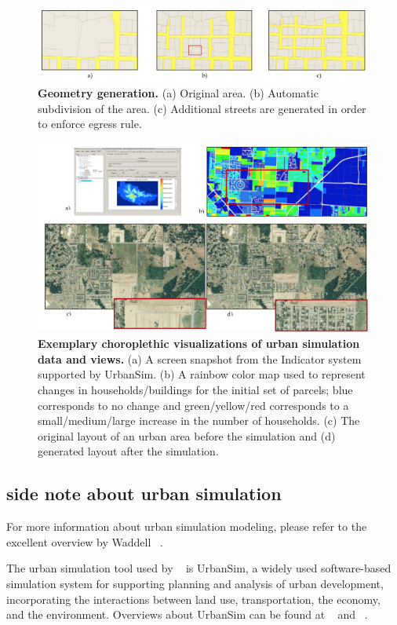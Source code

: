 \documentclass{egpubl}
\begin{document}
\begin{figure}[htb]
  \centering
  \includegraphics[width=0.9\linewidth]{star-5-5}
  \caption{\label{fig:star-5-5} \textbf{Geometry generation.} (a) Original area. (b) Automatic subdivision of the area. (c) Additional streets are generated in order to enforce egress rule.}
\end{figure}

\begin{figure}[htb]
  \centering
  \includegraphics[width=.95\linewidth]{star-5-6}
  \caption{\label{fig:star-5-6} \textbf{Exemplary choroplethic visualizations of urban simulation data and views.} (a) A screen snapshot from the Indicator system supported by UrbanSim. (b) A rainbow color map used to represent changes in households/buildings for the initial set of parcels; blue corresponds to no change and green/yellow/red corresponds to a small/medium/large increase in the number of households. (c) The original layout of an urban area before the simulation and (d) generated layout after the simulation.}
\end{figure}

\subsection{side note about urban simulation}

For more information about urban simulation modeling, please refer to the excellent overview by Waddell ~\cite{waddell2004introduction}.

The urban simulation tool used by ~\cite{vanegas2009visualization} is UrbanSim, a widely used software-based simulation system for supporting planning and analysis of urban development, incorporating the interactions between land use, transportation, the economy, and the environment. Overviews about UrbanSim can be found at ~\cite{waddell2002urbansim} and ~\cite{waddell2011integrated}.
\end{document}
